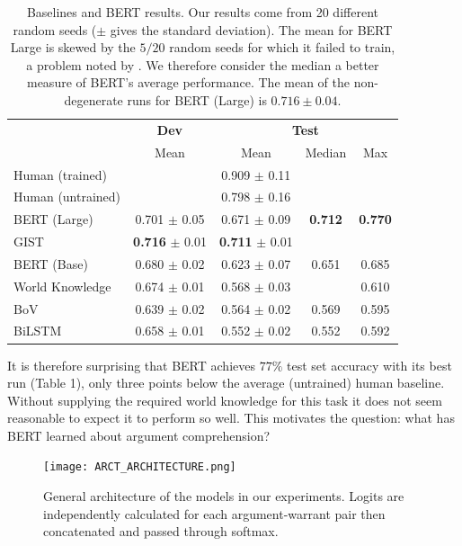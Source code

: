 \documentclass[11pt,a4paper]{article}
\begin{document}
\begin{table}[t]
\begin{center}
\small
\begin{tabular}{|l|c|ccc|}
\hline
\multirow{2}{*}{} & \multicolumn{1}{c|}{\textbf{Dev}} & \multicolumn{3}{c|}{\textbf{Test}} \\
& Mean & Mean & Median & Max \\
\hline
Human (trained) & & 0.909 $\pm$ 0.11 &  &  \\
Human (untrained) & & 0.798 $\pm$ 0.16 & &  \\
BERT (Large) & 0.701 $\pm$ 0.05 & 0.671 $\pm$ 0.09 & \textbf{0.712} & \textbf{0.770} \\
GIST \cite{ChoiL18} & \textbf{0.716} $\pm$ 0.01 & \textbf{0.711} $\pm$ 0.01 & &  \\
BERT (Base) & 0.680 $\pm$ 0.02 & 0.623 $\pm$ 0.07 & 0.651 & 0.685 \\
World Knowledge \cite{BotschenSG18} & 0.674 $\pm$ 0.01 & 0.568 $\pm$ 0.03 & & 0.610 \\
BoV & 0.639 $\pm$ 0.02 & 0.564 $\pm$ 0.02 & 0.569 & 0.595 \\
BiLSTM & 0.658 $\pm$ 0.01 & 0.552 $\pm$ 0.02 & 0.552 & 0.592 \\
\hline
\end{tabular}
\end{center}
\caption{Baselines and BERT results. Our results come from 20 different random seeds ($\pm$ gives the standard deviation). The mean for BERT Large is skewed by the $5/20$ random seeds for which it failed to train, a problem noted by \citeauthor{DevlinMKK18} . We therefore consider the median a better measure of BERT's average performance. The mean of the non-degenerate runs for BERT (Large) is $0.716 \pm 0.04$.}
\end{table}

It is therefore surprising that BERT \cite{DevlinMKK18} achieves $77\%$ test set accuracy with its best run (Table 1), only three points below the average (untrained) human baseline. Without supplying the required world knowledge for this task it does not seem reasonable to expect it to perform so well. This motivates the question: what has BERT learned about argument comprehension?

\begin{figure}[t]
\centering
\texttt{[image: ARCT\_ARCHITECTURE.png]}
\caption{General architecture of the models in our experiments. Logits are independently calculated for each argument-warrant pair then concatenated and passed through softmax.}
\end{figure}
\end{document}
